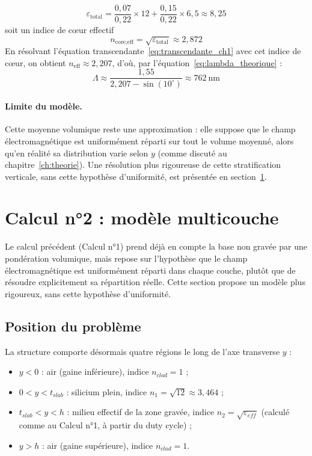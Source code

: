 \documentclass[a4paper,11pt]{report}
\begin{document}
\begin{equation}
\varepsilon_{\text{total}} = \frac{0{,}07}{0{,}22}\times12 + \frac{0{,}15}{0{,}22}\times6{,}5 \approx 8{,}25
\end{equation}
soit un indice de cœur effectif
\begin{equation}
n_{\text{core,eff}} = \sqrt{\varepsilon_{\text{total}}} \approx 2{,}872
\end{equation}
En résolvant l'équation transcendante~\eqref{eq:transcendante_ch1} avec cet indice de cœur, on obtient $n_{\text{eff}}\approx2{,}207$, d'où, par l'équation~\eqref{eq:lambda_theorique} :
\begin{equation}
\Lambda \approx \frac{1{,}55}{2{,}207-\sin(10^\circ)} \approx 762~\text{nm}
\end{equation}

\paragraph{Limite du modèle.} Cette moyenne volumique reste une approximation : elle suppose que le champ électromagnétique est uniformément réparti sur tout le volume moyenné, alors qu'en réalité sa distribution varie selon $y$ (comme discuté au chapitre~\ref{ch:theorie}). Une résolution plus rigoureuse de cette stratification verticale, sans cette hypothèse d'uniformité, est présentée en section~\ref{sec:calcul2}. 

\section{Calcul n°2 : modèle multicouche}
\label{sec:calcul2}

Le calcul précédent (Calcul n°1) prend déjà en compte la base non gravée par une pondération volumique, mais repose sur l'hypothèse que le champ électromagnétique est uniformément réparti dans chaque couche, plutôt que de résoudre explicitement sa répartition réelle. Cette section propose un modèle plus rigoureux, sans cette hypothèse d'uniformité.

\subsection*{Position du problème}

La structure comporte désormais quatre régions le long de l'axe transverse $y$ :
\begin{itemize}
    \item $y<0$ : air (gaine inférieure), indice $n_{clad}=1$ ;
    \item $0<y<t_{slab}$ : silicium plein, indice $n_1=\sqrt{12}\approx3{,}464$ ;
    \item $t_{slab}<y<h$ : milieu effectif de la zone gravée, indice $n_2=\sqrt{\varepsilon_{eff}}$ (calculé comme au Calcul n°1, à partir du duty cycle) ;
    \item $y>h$ : air (gaine supérieure), indice $n_{clad}=1$.
\end{itemize}
\end{document}
